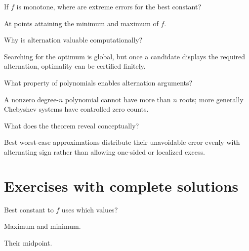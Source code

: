 \begin{problem}\label{prob:ii23-problem-09}
If $f$ is monotone, where are extreme errors for the best constant?
\end{problem}
\begin{solution}
At points attaining the minimum and maximum of $f$.
\end{solution}

\begin{problem}\label{prob:ii23-problem-10}
Why is alternation valuable computationally?
\end{problem}
\begin{solution}
Searching for the optimum is global, but once a candidate displays the required alternation, optimality can be certified finitely.
\end{solution}

\begin{problem}\label{prob:ii23-problem-11}
What property of polynomials enables alternation arguments?
\end{problem}
\begin{solution}
A nonzero degree-$n$ polynomial cannot have more than $n$ roots; more generally Chebyshev systems have controlled zero counts.
\end{solution}

\begin{problem}\label{prob:ii23-problem-12}
What does the theorem reveal conceptually?
\end{problem}
\begin{solution}
Best worst-case approximations distribute their unavoidable error evenly with alternating sign rather than allowing one-sided or localized excess.
\end{solution}

\section{Exercises with complete solutions}

\begin{exercise}\label{exr:ii23-01}
Best constant to $f$ uses which values?
\end{exercise}
\begin{hint}
Maximum and minimum.
\end{hint}
\begin{solution}
Their midpoint.
\end{solution}

